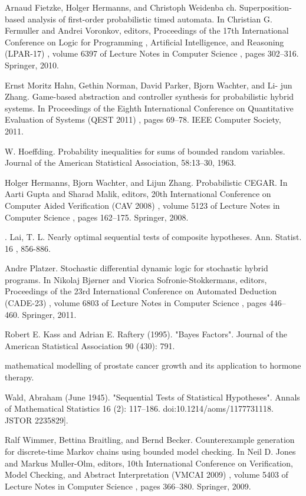 \documentclass[runningheads,a4paper]{llncs}
\begin{document}
\noindent[FHW10] Arnaud Fietzke, Holger Hermanns, and Christoph Weidenba ch. Superposition-based analysis of first-order probabilistic timed automata. In Christian G. Fermuller and Andrei Voronkov, editors, Proceedings of the 17th International Conference on Logic for Programming , Artificial Intelligence, and Reasoning (LPAR-17) , volume 6397 of Lecture Notes in Computer Science , pages 302–316. Springer, 2010.

\noindent[[HNP + 11] Ernst Moritz Hahn, Gethin Norman, David Parker, Bjorn Wachter, and Li- jun Zhang. Game-based abstraction and controller synthesis for probabilistic hybrid systems. In Proceedings of the Eighth International Conference on Quantitative Evaluation of Systems (QEST 2011) , pages 69–78. IEEE Computer Society, 2011.

\noindent[Hoe63] W. Hoeffding. Probability inequalities for sums of bounded random variables. Journal of the American Statistical Association, 58:13–30, 1963.

\noindent[HWZ08] Holger Hermanns, Bjorn Wachter, and Lijun Zhang. Probabilistic CEGAR. In Aarti Gupta and Sharad Malik, editors, 20th International Conference on Computer Aided Verification (CAV 2008) , volume 5123 of Lecture Notes in Computer Science , pages 162–175. Springer, 2008.

\noindent[Lai88]. Lai, T. L. Nearly optimal sequential tests of composite hypotheses. Ann. Statist. 16 , 856-886.

\noindent[Pla11] Andre Platzer. Stochastic differential dynamic logic for stochastic hybrid programs. In Nikolaj Bjørner and Viorica Sofronie-Stokkermans, editors, Proceedings of the 23rd International Conference on Automated Deduction (CADE-23) , volume 6803 of Lecture Notes in Computer Science , pages 446– 460. Springer, 2011.

\noindent[RA95] Robert E. Kass and Adrian E. Raftery (1995). "Bayes Factors". Journal of the American Statistical Association 90 (430): 791.

\noindent[THG10] mathematical modelling of prostate cancer growth and its application to hormone therapy.

\noindent[WA45] Wald, Abraham (June 1945). "Sequential Tests of Statistical Hypotheses". Annals of Mathematical Statistics 16 (2): 117–186. doi:10.1214/aoms/1177731118. JSTOR 2235829].

\noindent[WBB09] Ralf Wimmer, Bettina Braitling, and Bernd Becker. Counterexample generation for discrete-time Markov chains using bounded model checking. In Neil D. Jones and Markus Muller-Olm, editors, 10th International Conference on Verification, Model Checking, and Abstract Interpretation (VMCAI 2009) , volume 5403 of Lecture Notes in Computer Science , pages 366–380. Springer, 2009.
\end{document}

